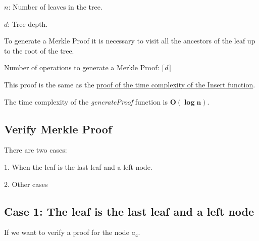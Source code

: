 \documentclass{article}
\begin{document}
$n$: Number of leaves in the tree.

$d$: Tree depth.



To generate a Merkle Proof it is necessary to visit all the ancestors of the leaf up to the root of the tree.



Number of operations to generate a Merkle Proof: $\lceil d \rceil$

This proof is the same as the \hyperref[InsertProof]{proof of the time complexity of the Insert function}.

The time complexity of the \textit{generateProof} function is $\boldsymbol{O(\log n)}$.



\subsection{Verify Merkle Proof}

There are two cases:

1. When the leaf is the last leaf and a left node.

2. Other cases



\subsection*{Case 1: The leaf is the last leaf and a left node}



If we want to verify a proof for the node $a_4$.
\end{document}
